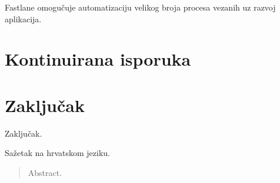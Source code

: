 \documentclass[times, utf8, diplomski, numeric]{fer}
\begin{document}
Fastlane omogučuje automatizaciju velikog broja procesa vezanih uz razvoj aplikacija.







\chapter{Kontinuirana isporuka}


\chapter{Zaključak}
Zaključak.




\begin{sazetak}
Sažetak na hrvatskom jeziku.

\end{sazetak}

\begin{abstract}
Abstract.

\end{abstract}
\end{document}
